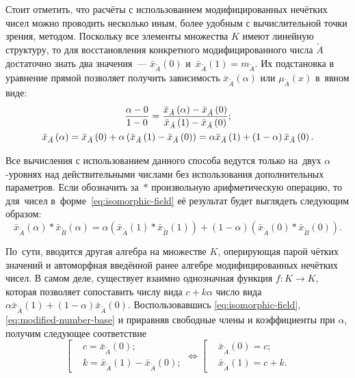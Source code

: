 Стоит отметить, что расчёты с использованием модифицированных нечётких чисел можно проводить несколько иным, более удобным с вычислительной точки зрения, методом. Поскольку все элементы множества $K$ имеют линейную структуру, то для восстановления конкретного модифицированного числа $\tilde{A}$ достаточно знать два значения~--- $\bar{x}_{\tilde A}\left( 0 \right)$ и~$\bar{x}_{\tilde A}\left( 1 \right)=m_{\tilde A}$. Их подстановка в уравнение прямой позволяет получить зависимость $\bar{x}_{\tilde A}\left( \alpha \right)$ или $\mu_{\tilde A}\left( x \right)$ в~явном виде:
\begin{gather}
  \frac{\alpha-0}{1-0}=\frac{\bar{x}_{\tilde A}\left( \alpha  \right)-\bar{x}_{\tilde A}\left( 0 \right)}{\bar{x}_{\tilde A}\left( 1 \right)-\bar{x}_{\tilde A}\left( 0 \right)}; \notag \\
  \label{eq:isomorphic-field}
  \bar{x}_{\tilde A}\left( \alpha \right)=\bar{x}_{\tilde A}\left( 0 \right)+\alpha \left(\bar{x}_{\tilde A}\left( 1 \right)-\bar{x}_{\tilde A}\left(0 \right) \right)=\alpha \bar{x}_{\tilde A}\left( 1 \right)+\left( 1-\alpha  \right) \bar{x}_{\tilde A}\left( 0 \right).
\end{gather}

Все вычисления с использованием данного способа ведутся только на~двух $\alpha $-уровнях над действительными числами без использования дополнительных параметров. Если обозначить за~$*$ произвольную арифметическую операцию, то для~чисел в~форме~\eqref{eq:isomorphic-field} её результат будет выглядеть следующим образом:
\begin{equation*}
  \bar{x}_{\tilde A}\left( \alpha \right)*\bar{x}_{\tilde B}\left(\alpha \right)=\alpha \left(\bar{x}_{\tilde A}\left( 1 \right)*\bar{x}_{\tilde B}\left(1 \right) \right)+\left(1-\alpha \right)\left(\bar{x}_{\tilde A}\left(0 \right)*\bar{x}_{\tilde B}\left(0 \right) \right).
\end{equation*}

По~сути, вводится другая алгебра на множестве $K$, оперирующая парой чётких значений и автоморфная введённой ранее алгебре модифицированных нечётких чисел. В самом деле, существует взаимно однозначная функция $f:K\to K$, которая позволяет сопоставить числу вида $c+k\alpha $ число вида $\alpha {{\bar{x}}_{\tilde A}}\left( 1 \right)+\left( 1-\alpha  \right){{\bar{x}}_{\tilde A}}\left( 0 \right)$. Воспользовавшись \eqref{eq:isomorphic-field}, \eqref{eq:modified-number-base} и приравняв свободные члены и коэффициенты при $\alpha$, получим следующее соответствие
\begin{equation*}
  \left[ \begin{aligned}
    & c=\bar{x}_{\tilde A}\left( 0 \right); \\ 
    & k=\bar{x}_{\tilde A}\left( 1 \right)-\bar{x}_{\tilde A}\left( 0 \right);
  \end{aligned} \right.
  \Leftrightarrow 
  \left[ \begin{aligned}
    & \bar{x}_{\tilde A}\left( 0 \right)=c; \\ 
    & \bar{x}_{\tilde A}\left( 1 \right)=c+k.
  \end{aligned} \right.
\end{equation*}


